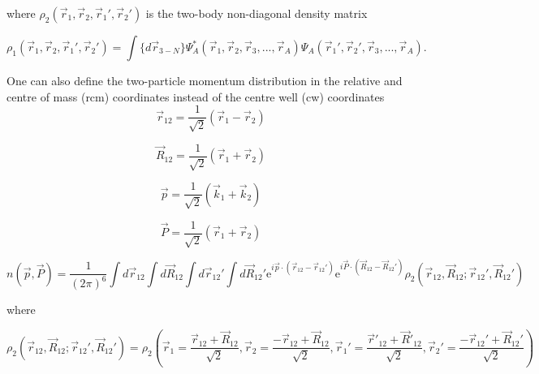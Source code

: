 \documentclass[12pt]{article}
\begin{document}
where $\rho_2(\vec{r}_1,\vec{r}_2, \vec{r}_1',\vec{r}_2')$ is the two-body non-diagonal density matrix


\begin{equation}
\rho_1(\vec{r}_1,\vec{r}_2, \vec{r}_1',\vec{r}_2') = \int \{d\vec{r}_{3-N}\} \Psi^*_A(\vec{r}_1,\vec{r}_2,\vec{r}_3, ... ,\vec{r}_A)\Psi_A(\vec{r}_1',\vec{r}_2',\vec{r}_3, ... ,\vec{r}_A).
\end{equation}

One can also define the two-particle momentum distribution in the relative and centre of mass (rcm) coordinates instead of the centre well (cw) coordinates
\begin{equation}
\vec{r}_{12}= \frac{1}{\sqrt{2}} \left(\vec{r}_1 - \vec{r}_2\right)  
\end{equation}

\begin{equation}
\vec{R}_{12}= \frac{1}{\sqrt{2}} \left(\vec{r}_1 + \vec{r}_2\right)
\end{equation}

\begin{equation}
\vec{p}= \frac{1}{\sqrt{2}} \left(\vec{k}_1 + \vec{k}_2\right)
\end{equation}

\begin{equation}
\vec{P}= \frac{1}{\sqrt{2}} \left(\vec{r}_1 + \vec{r}_2\right)
\end{equation}


\begin{equation}
n(\vec{p},\vec{P})=\frac{1}{(2\pi)^6}
						\int d\vec{r}_{12} \int d\vec{R}_{12} \int d\vec{r}_{12}' \int d\vec{R}_{12}' 
    						\mathrm{e}^{i\vec{p}\cdot (\vec{r}_{12}-\vec{r}_{12}')} 
    						\mathrm{e}^{i\vec{P}\cdot(\vec{R}_{12}-\vec{R}_{12}')} 
    						\rho_2(\vec{r}_{12},\vec{R}_{12}; \vec{r}_{12}',\vec{R}_{12}')
\end{equation}

where 

\begin{equation}
\rho_2(\vec{r}_{12},\vec{R}_{12}; \vec{r}_{12}',\vec{R}_{12}') = 
							\rho_2\left(	
							\vec{r}_1=\frac{\vec{r}_{12} + \vec{R}_{12}}{\sqrt{2}},
							\vec{r}_2=\frac{-\vec{r}_{12} + \vec{R}_{12}}{\sqrt{2}},
						    \vec{r}_1'=\frac{\vec{r}'_{12} + \vec{R}'_{12}}{\sqrt{2}},	
						    \vec{r}_2'=\frac{-\vec{r}_{12}' + \vec{R}_{12}'}{\sqrt{2}}
						    \right)
\end{equation}
 
\end{document}
